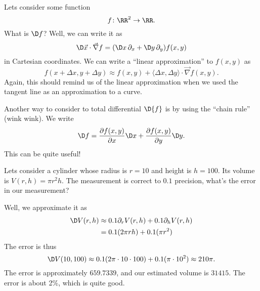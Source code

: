 Lets consider some function
\begin{equation}
f\colon\RR^{2}\to\RR.
\end{equation}
What is $\D f$? Well, we can write it as
\begin{equation}
\D\vec{x}\cdot\vec{\nabla}f = (\D x\,\partial_{x}+\D
y\,\partial_{y})f(x,y)
\end{equation}
in Cartesian coordinates. We can write a ``linear approximation''
to $f(x,y)$ as
\begin{equation}
f(x+\Delta x, y+\Delta y)\approx f(x,y) + \langle\Delta x,\Delta
y\rangle\cdot\vec{\nabla}f(x,y).
\end{equation}
Again, this should remind us of the linear approximation when we
used the tangent line as an approximation to a curve.

\M
Another way to consider to total differential $\D{f}$ is by using
the ``chain rule'' (wink wink). We write
\begin{equation}
\D f = \frac{\partial f(x,y)}{\partial x}\D x
+\frac{\partial f(x,y)}{\partial y}\D y.
\end{equation}
This can be quite useful!

\begin{example}
Lets consider a cylinder whose radius is $r=10$ and height is
$h=100$. Its volume is $V(r,h)=\pi r^{2}h$. The measurement is
correct to $0.1$ precision, what's the error in our measurement?

Well, we approximate it as
\begin{equation}
\begin{aligned}
\D V(r,h) &\approx 0.1\partial_{r}V(r,h) + 0.1\partial_{h}
V(r,h)\\
&= 0.1(2\pi rh) + 0.1(\pi r^{2})
\end{aligned}
\end{equation}
The error is thus
\begin{equation}
\D V(10,100) \approx 0.1 (2\pi\cdot10\cdot100) + 0.1(\pi\cdot 10^{2})
\approx 210\pi.
\end{equation}
The error is approximately $659.7339$, and our estimated volume
is $31415$. The error is about 2\%, which is quite good.
\end{example}
